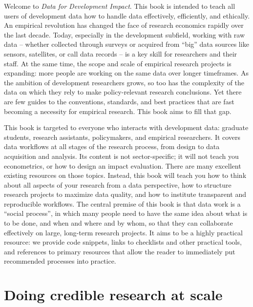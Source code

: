 \begin{fullwidth}
Welcome to \textit{Data for Development Impact}.
This book is intended to teach all users of development data
how to handle data effectively, efficiently, and ethically.
An empirical revolution has changed the face of research economics rapidly over the last decade.
Today, especially in the development subfield, working with raw data --
whether collected through surveys or acquired from ``big'' data sources like sensors, satellites, or call data records --
is a key skill for researchers and their staff.
At the same time, the scope and scale of empirical research projects is expanding:
more people are working on the same data over longer timeframes.
As the ambition of development researchers grows, so too has the complexity of the data
on which they rely to make policy-relevant research conclusions.
Yet there are few guides to the conventions, standards, and best practices
that are fast becoming a necessity for empirical research.
This book aims to fill that gap.

This book is targeted to everyone who interacts with development data:
graduate students, research assistants, policymakers, and empirical researchers.
It covers data workflows at all stages of the research process, from design to data acquisition and analysis.
Its content is not sector-specific; it will not teach you econometrics, or how to design an impact evaluation.
There are many excellent existing resources on those topics.
Instead, this book will teach you how to think about all aspects of your research from a data perspective,
how to structure research projects to maximize data quality,
and how to institute transparent and reproducible workflows.
The central premise of this book is that data work is a ``social process'',
in which many people need to have the same idea about what is to be done, and when and where and by whom,
so that they can collaborate effectively on large, long-term research projects.
It aims to be a highly practical resource: we provide code snippets, links to checklists and other practical tools,
and references to primary resources that allow the reader to immediately put recommended processes into practice.

\end{fullwidth}


\section{Doing credible research at scale}


